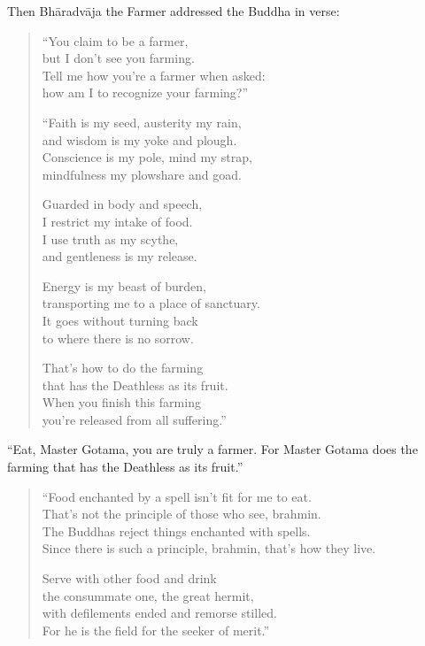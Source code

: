 \documentclass[12pt,openany]{book}%
\begin{document}
Then \textsanskrit{Bhāradvāja} the Farmer addressed the Buddha in verse: 

\begin{verse}%
“You claim to be a farmer, \\
but I don’t see you farming. \\
Tell me how you’re a farmer when asked: \\
how am I to recognize your farming?” 

“Faith is my seed, austerity my rain, \\
and wisdom is my yoke and plough. \\
Conscience is my pole, mind my strap, \\
mindfulness my plowshare and goad. 

Guarded in body and speech, \\
I restrict my intake of food. \\
I use truth as my scythe, \\
and gentleness is my release. 

Energy is my beast of burden, \\
transporting me to a place of sanctuary. \\
It goes without turning back \\
to where there is no sorrow. 

That’s how to do the farming \\
that has the Deathless as its fruit. \\
When you finish this farming \\
you’re released from all suffering.” 

%
\end{verse}

“Eat, Master Gotama, you are truly a farmer. For Master Gotama does the farming that has the Deathless as its fruit.” 

\begin{verse}%
“Food enchanted by a spell isn’t fit for me to eat. \\
That’s not the principle of those who see, brahmin. \\
The Buddhas reject things enchanted with spells. \\
Since there is such a principle, brahmin, that’s how they live. 

Serve with other food and drink \\
the consummate one, the great hermit, \\
with defilements ended and remorse stilled. \\
For he is the field for the seeker of merit.” 

%
\end{verse}
\end{document}
